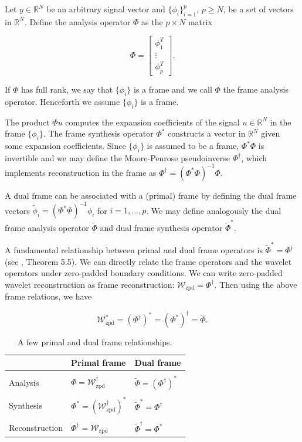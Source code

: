 \documentclass[journal]{IEEEtran}
\newcommand{\reals}{\mathbb{R}}
\begin{document}
Let $y\in\reals^N$ be an arbitrary signal vector and $\{\phi_i\}_{i=1}^p$, $p\ge N$, be a set of vectors in $\reals^N$.  Define the analysis operator $\Phi$ as the $p\times N$ matrix

\[ \Phi = \begin{bmatrix}\phi_1^T\\\vdots\\\phi_p^T\end{bmatrix}. \] 

   \noindent If $\Phi$ has full rank, we say that $\{\phi_i\}$ is a frame and we call $\Phi$ the frame analysis operator.  Henceforth we assume $\{\phi_i\}$ is a frame.
   
   The product $\Phi u$ computes the expansion coefficients of the signal ${u\in\reals^N}$ in the frame $\{\phi_i\}$.  The frame synthesis operator $\Phi^\ast$ constructs a vector in $\reals^N$ given some expansion coefficients.  Since $\{\phi_i\}$ is assumed to be a frame, $\Phi^\ast\Phi$ is invertible and we may define the Moore-Penrose pseudoinverse $\Phi^\dagger$, which implements reconstruction in the frame as $\Phi^\dagger=\left(\Phi^\ast\Phi\right)^{-1}\Phi$.

   A dual frame can be associated with a (primal) frame by defining the dual frame vectors $\tilde{\phi}_i = \left(\Phi^\ast\Phi\right)^{-1}\phi_i$ for $i=1,...,p$.  We may define analogously the dual frame analysis operator $\tilde{\Phi}$ and dual frame synthesis operator $\tilde{\Phi}^\ast$.

   \noindent A fundamental relationship between primal and dual frame operators is $\tilde{\Phi}^\ast = \Phi^\dagger$ (see \cite{mallat_2009}, Theorem 5.5).  We can directly relate the frame operators and the wavelet operators under zero-padded boundary conditions.  We can write zero-padded wavelet reconstruction as frame reconstruction: $\mathcal{W}_\text{zpd}=\Phi^\dagger$.  Then using the above frame relations, we have

   \begin{equation}
      \label{eq:wave_dual_frame}
      \mathcal{W}_\text{zpd}^\ast = \left(\Phi^\dagger\right)^\ast = \left(\Phi^\ast\right)^\dagger = \tilde{\Phi}.
   \end{equation}

\begin{table}[ht]
   \centering
   \caption{A few primal and dual frame relationships.}
   \label{tab:frame_relations}
   \begin{tabular}{lll}
      &Primal frame&Dual frame\\\hline\\[-0.5em]
      Analysis & $\Phi = \mathcal{W}_\text{zpd}^\dagger$ & $\tilde{\Phi}=\left(\Phi^\dagger\right)^\ast$\\\\[-0.5em]
      Synthesis & $\Phi^\ast = \left(\mathcal{W}_\text{zpd}^\dagger\right)^\ast$ & $\tilde{\Phi}^\ast = \Phi^\dagger$ \\\\[-0.5em]
      Reconstruction & $\Phi^\dagger = \mathcal{W}_\text{zpd}$ & $\tilde{\Phi}^\dagger = \Phi^\ast$
   \end{tabular}
\end{table}
\end{document}
